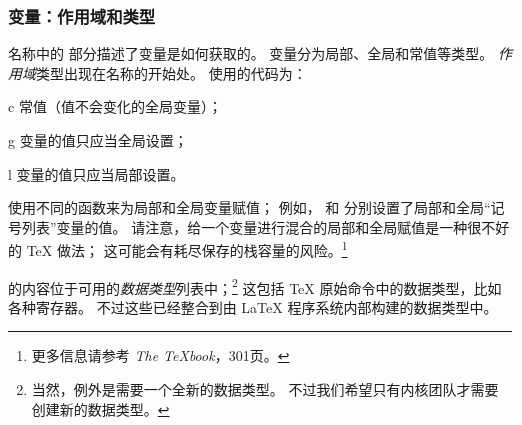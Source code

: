 \documentclass[full]{l3doc}
\newenvironment{arg-description}{%
\begin{itemize}\def\makelabel##1{\hss\llap{\bfseries##1}}}{\end{itemize}}
\begin{document}
\subsubsection{变量：作用域和类型}

%
%

名称中的  部分描述了变量是如何获取的。
变量分为局部、全局和常值等类型。
\emph{作用域}类型出现在名称的开始处。
使用的代码为：
\begin{arg-description}
    \item[c] 常值（值不会变化的全局变量）；
    \item[g] 变量的值只应当全局设置；
    \item[l] 变量的值只应当局部设置。
\end{arg-description}


使用不同的函数来为局部和全局变量赋值；
例如， 和  分别设置了局部和全局“记号列表”变量的值。
请注意，给一个变量进行混合的局部和全局赋值是一种很不好的 \TeX{} 做法；
这可能会有耗尽保存的栈容量的风险。\footnote{
更多信息请参考 \emph{The \TeX{}book}，301页。}

%
%
 的内容位于可用的\emph{数据类型}列表中；\footnote{
当然，例外是需要一个全新的数据类型。
不过我们希望只有内核团队才需要创建新的数据类型。}
这包括 \TeX{} 原始命令中的数据类型，比如各种寄存器。
不过这些已经整合到由 \LaTeX{} 程序系统内部构建的数据类型中。
\end{document}
